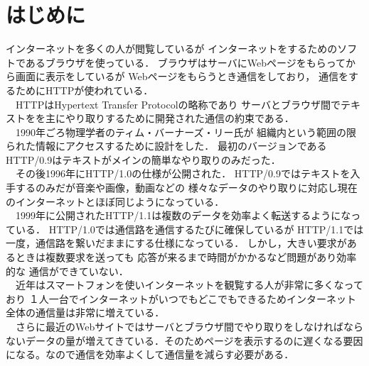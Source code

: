 \documentclass[a4j,9pt,twocolumn]{jsarticle}
\begin{document}





\section{はじめに}
インターネットを多くの人が閲覧しているが
インターネットをするためのソフトであるブラウザを使っている．
ブラウザはサーバにWebページをもらってから画面に表示をしているが
Webページをもらうとき通信をしており，
通信をするためにHTTPが使われている．
\\　HTTPはHypertext Transfer Protocolの略称であり
サーバとブラウザ間でテキストをを主にやり取りするために開発された通信の約束である．
\\　1990年ごろ物理学者のティム・バーナーズ・リー氏が
組織内という範囲の限られた情報にアクセスするために設計をした．
最初のバージョンであるHTTP/0.9はテキストがメインの簡単なやり取りのみだった．
\\　その後1996年にHTTP/1.0の仕様が公開された．
HTTP/0.9ではテキストを入手するのみだが音楽や画像，動画などの
様々なデータのやり取りに対応し現在のインターネットとほぼ同じようになっている．
\\　1999年に公開されたHTTP/1.1は複数のデータを効率よく転送するようになっている．
HTTP/1.0では通信路を通信するたびに確保しているが
HTTP/1.1では一度，通信路を繋いだままにする仕様になっている．
しかし，大きい要求があるときは複数要求を送っても
応答が来るまで時間がかかるなど問題があり効率的な
通信ができていない．
\\　近年はスマートフォンを使いインターネットを観覧する人が非常に多くなっており
１人一台でインターネットがいつでもどこでもできるためインターネット全体の通信量は非常に増えている．
\\　さらに最近のWebサイトではサーバとブラウザ間でやり取りをしなければならないデータの量が増えてきている．そのためページを表示するのに遅くなる要因になる。なので通信を効率よくして通信量を減らす必要がある．
\end{document}
